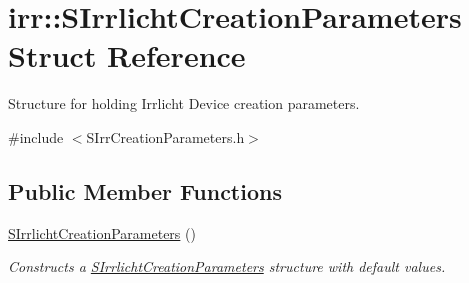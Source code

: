 \hypertarget{structirr_1_1SIrrlichtCreationParameters}{}\section{irr\+:\+:S\+Irrlicht\+Creation\+Parameters Struct Reference}
\label{structirr_1_1SIrrlichtCreationParameters}


Structure for holding Irrlicht Device creation parameters.  




{\ttfamily \#include $<$S\+Irr\+Creation\+Parameters.\+h$>$}

\subsection*{Public Member Functions}
\begin{DoxyCompactItemize}
\item 
\mbox{\label{structirr_1_1SIrrlichtCreationParameters_a466e3b6d57ea40bdcacd6aae892845f1}} 
\hyperlink{structirr_1_1SIrrlichtCreationParameters_a466e3b6d57ea40bdcacd6aae892845f1}{S\+Irrlicht\+Creation\+Parameters} ()
\begin{DoxyCompactList}\small\item\em Constructs a \hyperlink{structirr_1_1SIrrlichtCreationParameters}{S\+Irrlicht\+Creation\+Parameters} structure with default values. \end{DoxyCompactList}\end{DoxyCompactItemize}
